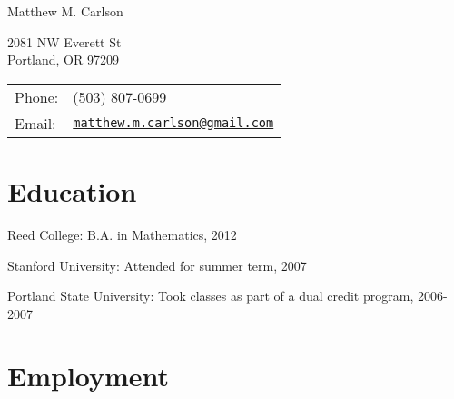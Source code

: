 \documentclass[letterpaper]{article}
\def\name{Matthew M. Carlson}%
\renewenvironment{itemize}{\begin{list}{}{\setlength{\leftmargin}{1.5em}}}{\end{list}}%
\begin{document}
{\huge \name}%
\vspace{0.25in}

\begin{minipage}{0.45\linewidth}
	2081 NW Everett St \\
	Portland, OR 97209
\end{minipage}
\begin{minipage}{0.45\linewidth}
	\begin{tabular}{ll}
	Phone: & (503) 807-0699 \\
	Email: & \href{mailto:matthew.m.carlson@gmail.com}{\tt matthew.m.carlson@gmail.com} \\
  \end{tabular}
\end{minipage}





\section*{Education}

\begin{itemize}
  \item Reed College: B.A. in Mathematics, 2012
  \item Stanford University: Attended for summer term, 2007
  \item Portland State University: Took classes as part of a dual credit program, 2006-2007
\end{itemize}


\section*{Employment}%
\end{document}
